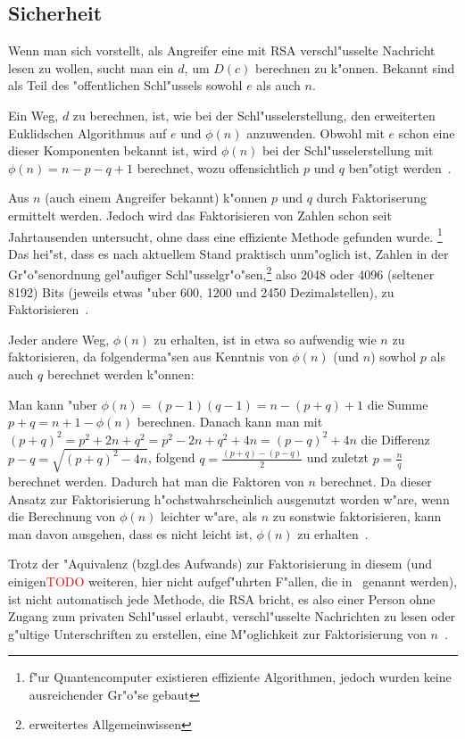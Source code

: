\documentclass[12pt]{article}
\newcommand{\todo}[1]{\textcolor{red}{\mbox{TODO}}\marginpar{\textcolor{red}{#1}}}
\begin{document}
\subsection{Sicherheit}

Wenn man sich vorstellt, als Angreifer eine mit RSA verschl"usselte Nachricht
lesen zu wollen, sucht man ein $d$, um $D(c)$ berechnen zu k"onnen.
Bekannt sind als Teil des "offentlichen Schl"ussels sowohl $e$ als auch $n$.

Ein Weg, $d$ zu berechnen, ist, wie bei der Schl"usselerstellung,
den erweiterten Euklidschen Algorithmus auf $e$ und $\phi(n)$ anzuwenden.
Obwohl mit $e$ schon eine dieser Komponenten bekannt ist, wird $\phi(n)$
bei der Schl"usselerstellung mit $\phi(n) = n - p - q + 1$ berechnet,
wozu offensichtlich $p$ und $q$ ben"otigt werden~\cite{rsa}.

Aus $n$ (auch einem Angreifer bekannt) k"onnen $p$ und $q$ durch Faktoriserung ermittelt werden.
Jedoch wird das Faktorisieren von Zahlen schon seit Jahrtausenden untersucht,
ohne dass eine effiziente Methode gefunden wurde.%
\footnote{f"ur Quantencomputer existieren effiziente Algorithmen,
jedoch wurden keine ausreichender Gr"o"se gebaut}
Das hei"st, dass es nach aktuellem Stand praktisch unm"oglich ist,
Zahlen in der Gr"o"senordnung gel"aufiger Schl"usselgr"o"sen,\footnote{erweitertes Allgemeinwissen}
also 2048 oder 4096 (seltener 8192) Bits (jeweils etwas "uber 600, 1200 und 2450 Dezimalstellen),
zu Faktorisieren~\cite{sinews}.

Jeder andere Weg, $\phi(n)$ zu erhalten, ist in etwa so aufwendig wie $n$ zu faktorisieren,
da folgenderma"sen aus Kenntnis von $\phi(n)$ (und $n$) sowhol $p$ als auch $q$ berechnet werden k"onnen:

Man kann "uber $\phi(n) = (p-1)(q-1) = n - (p+q) + 1$ die Summe $p+q = n + 1 - \phi(n)$ berechnen.
Danach kann man mit $(p+q)^2 = p^2 + 2n + q^2 = p^2 - 2n + q^2 + 4n = (p-q)^2 + 4n$
die Differenz $p-q = \sqrt{(p+q)^2 - 4n}$, folgend $q = \frac{(p+q) - (p-q)}{2}$
und zuletzt $p = \frac{n}{q}$ berechnet werden.
Dadurch hat man die Faktoren von $n$ berechnet.
Da dieser Ansatz zur Faktorisierung h"ochstwahrscheinlich ausgenutzt worden w"are,
wenn die Berechnung von $\phi(n)$ leichter w"are, als $n$ zu sonstwie faktorisieren,
kann man davon ausgehen, dass es nicht leicht ist, $\phi(n)$ zu erhalten~\cite{rsa}.

Trotz der "Aquivalenz (bzgl.\@ des Aufwands) zur Faktorisierung in diesem (und einigen\todo{eigentlich nur einer} weiteren,
hier nicht aufgef"uhrten F"allen, die in~\cite{rsa} genannt werden),
ist nicht automatisch jede Methode, die RSA bricht,
es also einer Person ohne Zugang zum privaten Schl"ussel erlaubt,
verschl"usselte Nachrichten zu lesen oder g"ultige Unterschriften zu erstellen,
eine M"oglichkeit zur Faktorisierung von $n$~\cite{sinews}.
\end{document}
